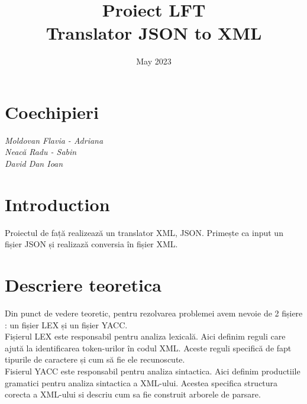 \documentclass{article}
\title{Proiect LFT \\
Translator JSON to XML}
\date{May 2023}
\begin{document}
\maketitle
\section{Coechipieri}
\textit{Moldovan Flavia - Adriana} \\
\textit{Neacă Radu - Sabin}\\
\textit{David Dan Ioan}\\
\section{Introduction}
Proiectul de față realizează un translator XML, JSON. Primește ca input un fișier JSON și realizază conversia în fișier XML. \\
\section{Descriere teoretica}
Din punct  de vedere teoretic, pentru rezolvarea problemei avem nevoie de 2 fișiere : un fișier LEX și un fișier YACC. \\
Fișierul LEX este responsabil pentru analiza lexicală. Aici definim reguli care ajută la identificarea token-urilor în codul XML. Aceste reguli specifică de fapt tipurile de caractere și cum să fie ele recunoscute.\\
Fisierul YACC este responsabil pentru analiza sintactica. Aici definim productiile gramatici pentru analiza sintactica a XML-ului. Acestea specifica structura corecta a XML-ului si descriu cum sa fie construit arborele de parsare.
\end{document}
